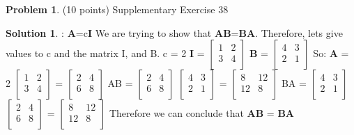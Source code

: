 \documentclass{article}
\theoremstyle{definition}
\newtheorem{problem}{Problem}
\newtheorem*{solution}{Solution}
\begin{document}
\begin{problem} (10 points) 
Supplementary Exercise 38
\end{problem}
\begin{solution}:
\newline
\textbf{A}=c\textbf{I}
\newline
We are trying to show that \textbf{AB}=\textbf{BA}.
\newline
Therefore, lets give values to c and the matrix I, and B. 
\newline
c = 2
\newline
\textbf{I} = $\begin{bmatrix}
    1 & 2 \\
    3 & 4 \\
\end{bmatrix}$
\newline
\textbf{B} = $\begin{bmatrix}
    4 & 3 \\
    2 & 1 \\
\end{bmatrix}$
\newline
So: \textbf{A} = 2  $\begin{bmatrix}
    1 & 2 \\
    3 & 4 \\
\end{bmatrix}$ = $\begin{bmatrix}
   2 & 4 \\
    6 & 8 \\
\end{bmatrix}$
\newline
AB = $\begin{bmatrix}
    2 & 4 \\
    6 & 8 \\
\end{bmatrix}$ $\begin{bmatrix}
    4 & 3 \\
    2 & 1 \\
\end{bmatrix}$ = $\begin{bmatrix}
    8 & 12 \\
    12 & 8 \\
\end{bmatrix}$
\newline
BA = $\begin{bmatrix}
    4 & 3 \\
    2 & 1 \\
\end{bmatrix}$ $\begin{bmatrix}
    2 & 4 \\
    6 & 8 \\
\end{bmatrix}$ = $\begin{bmatrix}
    8 & 12 \\
    12 & 8 \\
\end{bmatrix}$
\newline
Therefore we can conclude that \textbf{AB} = \textbf{BA}

\end{solution}
\end{document}

